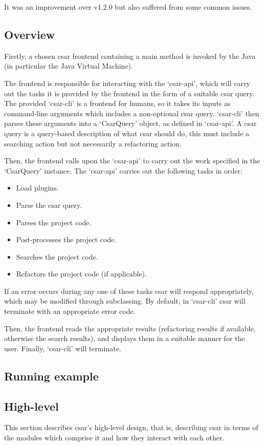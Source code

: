 \documentclass[12pt, letterpaper]{article}
\begin{document}
It was an improvement over v1.2.0 but also suffered from some common issues.

\subsection{Overview}
Firstly, a chosen csar frontend containing a main method is invoked by the Java (in particular the Java Virtual Machine).

The frontend is responsible for interacting with the `csar-api', which will carry out the tasks it is provided by the frontend in the form of a suitable csar query.
The provided `csar-cli' is a frontend for humans, so it takes its inputs as command-line arguments which includes a non-optional csar query.
`csar-cli' then parses these arguments into a `CsarQuery' object, as defined in `csar-api'.
A csar query is a query-based description of what csar should do, this must include a searching action but not necessarily a refactoring action.

Then, the frontend calls upon the `csar-api' to carry out the work specified in the `CsarQuery' instance.
The `csar-api' carries out the following tasks in order:
\begin{itemize}
  \item Load plugins.
  \item Parse the csar query.
  \item Parses the project code.
  \item Post-processes the project code.
  \item Searches the project code.
  \item Refactors the project code (if applicable).
\end{itemize}
If an error occurs during any one of these tasks csar will respond appropriately, which may be modified through subclassing.
By default, in `csar-cli' csar will terminate with an appropriate error code.

Then, the frontend reads the appropriate results (refactoring results if available, otherwise the search results), and displays them in a suitable manner for the user.
Finally, `csar-cli' will terminate.

\subsection{Running example}

\subsection{High-level}
This section describes csar's high-level design, that is, describing csar in terms of the modules which comprise it and how they interact with each other.
\end{document}

